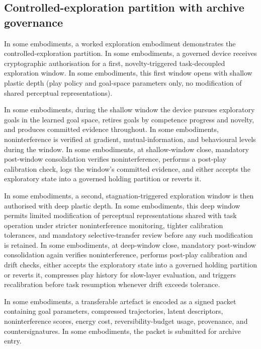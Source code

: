 \documentclass[a4paper,12pt]{article}
\begin{document}
\subsection{Controlled-exploration partition with archive governance}

In some embodiments, a worked exploration embodiment demonstrates the
controlled-exploration partition. In some embodiments, a governed
device receives cryptographic authorisation for a first,
novelty-triggered task-decoupled exploration window. In some
embodiments, this first window opens with shallow plastic depth (play
policy and goal-space parameters only, no modification of shared
perceptual representations).

In some embodiments, during the shallow window the device pursues
exploratory goals in the learned goal space, retires goals by
competence progress and novelty, and produces committed evidence
throughout. In some embodiments, noninterference is verified at
gradient, mutual-information, and behavioural levels during the
window. In some embodiments, at shallow-window close, mandatory
post-window consolidation verifies noninterference, performs a
post-play calibration check, logs the window's committed evidence, and
either accepts the exploratory state into a governed holding partition
or reverts it.

In some embodiments, a second, stagnation-triggered exploration window
is then authorised with deep plastic depth. In some embodiments, this
deep window permits limited modification of perceptual
representations shared with task operation under stricter
noninterference monitoring, tighter calibration tolerances, and
mandatory selective-transfer review before any such modification is
retained. In some embodiments, at deep-window close, mandatory
post-window consolidation again verifies noninterference, performs
post-play calibration and drift checks, either accepts the
exploratory state into a governed holding partition or reverts it,
compresses play history for slow-layer evaluation, and triggers
recalibration before task resumption whenever drift exceeds tolerance.

In some embodiments, a transferable artefact is encoded as a signed
packet containing goal parameters, compressed trajectories, latent
descriptors, noninterference scores, energy cost,
reversibility-budget usage, provenance, and countersignatures. In some
embodiments, the packet is submitted for archive entry.
\end{document}
